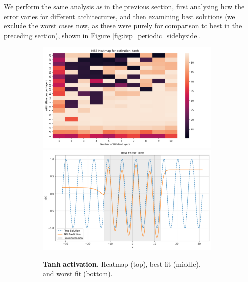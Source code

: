We perform the same analysis as in the previous section, first analysing how the error varies
for different architectures, and then examining best solutions (we exclude the worst 
cases now, as these were purely for comparison to best in the preceding section), shown in Figure 
\ref{fig:ivp_periodic_sidebyside}.

\begin{figure}[h]
    \centering
    \hspace*{\fill}
    \begin{subfigure}[t]{0.48\textwidth}
        \centering
        \includegraphics[width=\textwidth]{graphics/mse_heatmap_ivp_periodic_tanh.png}
        \includegraphics[width=\textwidth]{graphics/ivp_periodic_best_fit_tanh_7layers_15width.png}
        \caption{\textbf{Tanh activation.} Heatmap (top), best fit (middle), and worst fit (bottom).}
        \label{fig:ivp_periodic_tanh}
    \end{subfigure}
    \hspace*{\fill}
    \begin{subfigure}[t]{0.48\textwidth}

\end{subfigure}
\end{figure}

